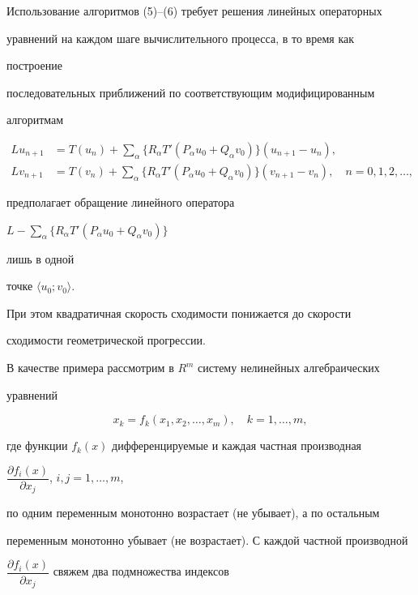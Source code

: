 Использование алгоритмов (5)--(6) требует решения линейных операторных


уравнений на каждом шаге вычислительного процесса, в то время как


построение


последовательных приближений по соответствующим модифицированным


алгоритмам


\begin{align*}


Lu_{n+1}&=T(u_n)+\sum_\alpha\{R_\alpha T'(P_\alpha u_0+


Q_\alpha v_0)\}(u_{n+1}-u_n),\\


Lv_{n+1}&=T(v_n)+\sum_\alpha


\{R_\alpha T'(P_\alpha u_0+Q_\alpha v_0)\}


(v_{n+1}-v_n),\quad n=0,1,2,\dotsc,


\end{align*}


предполагает обращение линейного оператора


$L-\sum\limits_\alpha\{R_\alpha T'(P_\alpha u_0+Q_\alpha v_0)\}$


лишь в одной


точке $\langle u_0;v_0\rangle$.


При этом квадратичная скорость сходимости понижается до скорости


сходимости геометрической прогрессии.





В качестве примера рассмотрим в $R^m$ систему нелинейных алгебраических


уравнений


\begin{equation}


x_k=f_k(x_1,x_2,\dotsc,x_m),\quad k=1,\dotsc,m,


\end{equation}


где функции $f_k(x)$ дифференцируемые и каждая частная производная


$\dfrac{\partial f_i(x)}{\partial x_j}$, $i,j=1,\dotsc,m$,


по одним переменным монотонно возрастает (не убывает), а по остальным


переменным монотонно убывает (не возрастает). С каждой частной производной


$\dfrac{\partial f_i(x)}{\partial x_j}$ свяжем два подмножества индексов



